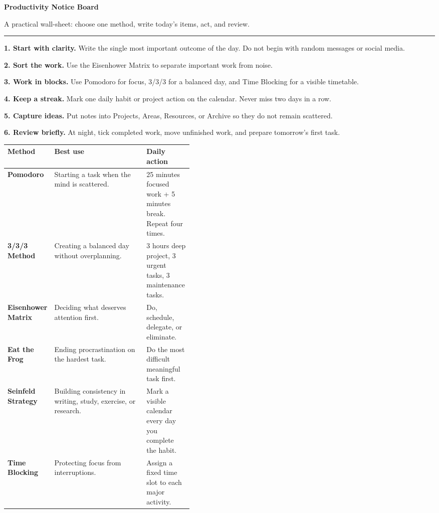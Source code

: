 \documentclass[10pt,a4paper]{article}
\newcommand{\pagetitle}[2]{%
  {\fontsize{26}{29}\selectfont\bfseries #1}\par
  {\large\color{SoftInk}#2}\par\vspace{3mm}\hrule\vspace{4mm}
}
\begin{document}

\pagetitle{Productivity Notice Board}{A practical wall-sheet: choose one method, write today's items, act, and review.}

\begin{tcolorbox}[usebox,title={How to use this board}]
\begin{multicols}{3}
\textbf{1. Start with clarity.} Write the single most important outcome of the day. Do not begin with random messages or social media.\par
\textbf{2. Sort the work.} Use the Eisenhower Matrix to separate important work from noise.\par
\textbf{3. Work in blocks.} Use Pomodoro for focus, 3/3/3 for a balanced day, and Time Blocking for a visible timetable.\par
\textbf{4. Keep a streak.} Mark one daily habit or project action on the calendar. Never miss two days in a row.\par
\textbf{5. Capture ideas.} Put notes into Projects, Areas, Resources, or Archive so they do not remain scattered.\par
\textbf{6. Review briefly.} At night, tick completed work, move unfinished work, and prepare tomorrow's first task.
\end{multicols}
\end{tcolorbox}

\vspace{2mm}
\begin{tcolorbox}[blankbox,title={Six methods at a glance}]
\begin{tabularx}{\linewidth}{>{\bfseries}p{0.18\linewidth}X p{0.25\linewidth}}
\toprule
Method & Best use & Daily action \\
\midrule
Pomodoro & Starting a task when the mind is scattered. & 25 minutes focused work + 5 minutes break. Repeat four times. \\
3/3/3 Method & Creating a balanced day without overplanning. & 3 hours deep project, 3 urgent tasks, 3 maintenance tasks. \\
Eisenhower Matrix & Deciding what deserves attention first. & Do, schedule, delegate, or eliminate. \\
Eat the Frog & Ending procrastination on the hardest task. & Do the most difficult meaningful task first. \\
Seinfeld Strategy & Building consistency in writing, study, exercise, or research. & Mark a visible calendar every day you complete the habit. \\
Time Blocking & Protecting focus from interruptions. & Assign a fixed time slot to each major activity. \\
\bottomrule
\end{tabularx}
\end{tcolorbox}
\end{document}
